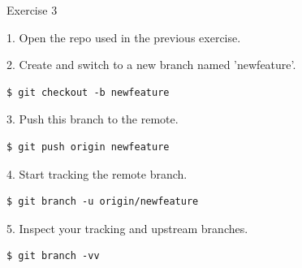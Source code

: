 \documentclass[handout]{beamer}
\begin{document}
\begin{frame}[fragile]{Exercise 3}

1. Open the repo used in the previous exercise. 

\vspace{0.3cm}

2. Create and switch to a new branch named 'newfeature'.

\begin{lstlisting}
$ git checkout -b newfeature
\end{lstlisting}

3. Push this branch to the remote.

\begin{lstlisting}
$ git push origin newfeature
\end{lstlisting}

4. Start tracking the remote branch.

\begin{lstlisting}
$ git branch -u origin/newfeature
\end{lstlisting}

5. Inspect your tracking and upstream branches.

\begin{lstlisting}
$ git branch -vv
\end{lstlisting}

\end{frame}
\end{document}
